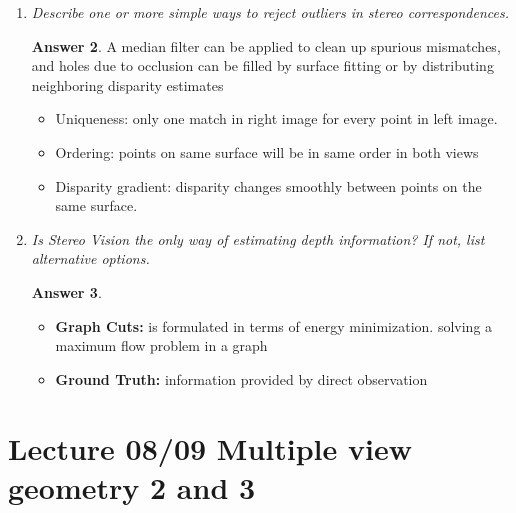 \documentclass[a4paper,12 pt]{article}
\theoremstyle{definition}
\theoremstyle{remark}
\theoremstyle{definition}
\theoremstyle{definition}
\theoremstyle{definition}
\theoremstyle{definition}
\theoremstyle{remark}
\theoremstyle{remark}
\theoremstyle{definition}
\theoremstyle{definition}
\newtheorem*{answer}{Answer}
\begin{document}
\begin{enumerate}
\begin{answer}
\end{answer}
\item \textit{Describe one or more simple ways to reject outliers in stereo correspondences.}
\begin{answer}
 A median filter can be applied to clean up spurious mismatches, and holes due to occlusion can be filled by surface fitting or by distributing neighboring disparity estimates
 \begin{itemize}
\item Uniqueness: only one match in right image for every point in left image.
\item Ordering: points on same surface will be in same order in both views
\item Disparity gradient: disparity changes smoothly between points on the same surface.
\end{itemize}
\end{answer}
\item \textit{Is Stereo Vision the only way of estimating depth information? If not, list alternative options.}
\begin{answer}
\
\begin{itemize}
\item \textbf{Graph Cuts:} is formulated in terms of energy minimization. solving a maximum flow problem in a graph
\item \textbf{Ground Truth:} information provided by direct observation
\end{itemize}
\end{answer}
\end{enumerate}
\newpage
\section*{Lecture 08/09 Multiple view geometry 2 and 3}
 
\end{document}
